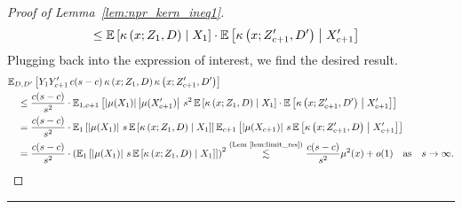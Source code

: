 \begin{proof}[Proof of Lemma~\ref{lem:npr_kern_ineq1}]
\begin{equation}
\begin{aligned}
			 & \leq \mathbb{E}\left[\kappa\left(x; Z_{1}, D\right) \; \middle| \; X_1\right]
			\cdot \mathbb{E}\left[\kappa\left(x; Z_{c+1}^{\prime}, D^{\prime}\right) \; \middle| \; X_{c+1}^{\prime}\right]
		\end{aligned}
	\end{equation}
	Plugging back into the expression of interest, we find the desired result.
	\begin{equation}
		\begin{aligned}
			 & \mathbb{E}_{D, D^{\prime}}\left[Y_{1}Y_{c+1}^{\prime} \, c(s-c) \, \kappa\left(x; Z_{1}, D\right)\kappa\left(x; Z_{c+1}^{\prime}, D^{\prime}\right)\right]                \\
			 & \quad \leq \frac{c(s-c)}{s^2} \cdot \mathbb{E}_{1, c+1}\left[\left|\mu(X_1)\right| \left|\mu(X_{c+1}^{\prime})\right| \, s^2 \,
				\mathbb{E}\left[\kappa\left(x; Z_{1}, D\right) \; \middle| \; X_1\right]
			\cdot \mathbb{E}\left[\kappa\left(x; Z_{c+1}^{\prime}, D^{\prime}\right) \; \middle| \; X_{c+1}^{\prime}\right]\right]                                                       \\
			 & \quad = \frac{c(s-c)}{s^2} \cdot \mathbb{E}_{1}\left[\left|\mu(X_1)\right| \, s \, \mathbb{E}\left[\kappa\left(x; Z_{1}, D\right) \; \middle| \; X_1\right]\right]
			\mathbb{E}_{c+1}\left[\left|\mu(X_{c+1})\right| \, s \, \mathbb{E}\left[\kappa\left(x; Z_{c+1}^{\prime}, D\right) \; \middle| \; X_{c+1}^{\prime}\right]\right]                      \\
			 & \quad = \frac{c(s-c)}{s^2} \cdot \left(\mathbb{E}_{1}\left[\left|\mu(X_1)\right| \, s \, \mathbb{E}\left[\kappa\left(x; Z_{1}, D\right) \; \middle| \; X_1\right]\right]\right)^2
			\overset{\text{(Lem~\ref{lem:limit_res})}}{\lesssim}  \frac{c(s-c)}{s^2}\mu^2(x) + o(1)
			\quad \text{as} \quad s \rightarrow \infty.
		\end{aligned}
	\end{equation}
\end{proof}

\hrule

